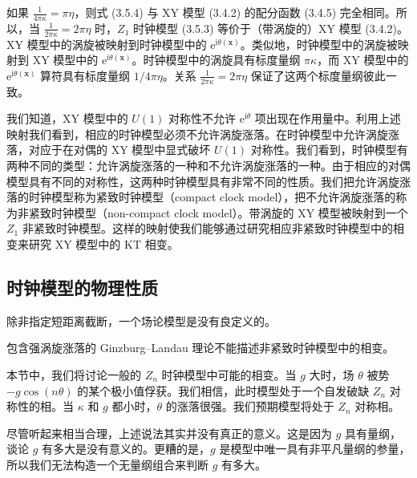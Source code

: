 如果 $\frac{1}{4\pi\kappa} = \pi\eta$，则式 (3.5.4) 与 XY 模型 (3.4.2) 的配分函数 (3.4.5) 完全相同。所以，当 $\frac{1}{2\pi\kappa} = 2\pi\eta$ 时，$Z_{1}$ 时钟模型 (3.5.3) 等价于（带涡旋的）XY 模型 (3.4.2)。XY 模型中的涡旋被映射到时钟模型中的 $\mathrm{e}^{\mathrm{i}\theta(\pmb{x})}$。类似地，时钟模型中的涡旋被映射到 XY 模型中的 $\mathrm{e}^{\mathrm{i}\theta(\pmb{x})}$。时钟模型中的涡旋具有标度量纲 $\pi\kappa$，而 XY 模型中的 $\mathrm{e}^{\mathrm{i}\theta(\pmb{x})}$ 算符具有标度量纲 $1/4\pi\eta$。关系 $\frac{1}{2\pi\kappa} = 2\pi\eta$ 保证了这两个标度量纲彼此一致。

我们知道，XY 模型中的 $U(1)$ 对称性不允许 $\mathrm{e}^{\mathrm{i}\theta}$ 项出现在作用量中。利用上述映射我们看到，相应的时钟模型必须不允许涡旋涨落。在时钟模型中允许涡旋涨落，对应于在对偶的 XY 模型中显式破坏 $U(1)$ 对称性。我们看到，时钟模型有两种不同的类型：允许涡旋涨落的一种和不允许涡旋涨落的一种。由于相应的对偶模型具有不同的对称性，这两种时钟模型具有非常不同的性质。我们把允许涡旋涨落的时钟模型称为紧致时钟模型（compact clock model），把不允许涡旋涨落的称为非紧致时钟模型（non-compact clock model）。带涡旋的 XY 模型被映射到一个 $Z_{1}$ 非紧致时钟模型。这样的映射使我们能够通过研究相应非紧致时钟模型中的相变来研究 XY 模型中的 KT 相变。

\subsection{时钟模型的物理性质}
\begin{keypoints}
\item 除非指定短距离截断，一个场论模型是没有良定义的。
\item 包含强涡旋涨落的 Ginzburg--Landau 理论不能描述非紧致时钟模型中的相变。
\end{keypoints}

本节中，我们将讨论一般的 $Z_{n}$ 时钟模型中可能的相变。当 $g$ 大时，场 $\theta$ 被势 $-g\cos(n\theta)$ 的某个极小值俘获。我们相信，此时模型处于一个自发破缺 $Z_{n}$ 对称性的相。当 $\kappa$ 和 $g$ 都小时，$\theta$ 的涨落很强。我们预期模型将处于 $Z_{n}$ 对称相。

尽管听起来相当合理，上述说法其实并没有真正的意义。这是因为 $g$ 具有量纲，谈论 $g$ 有多大是没有意义的。更糟的是，$g$ 是模型中唯一具有非平凡量纲的参量，所以我们无法构造一个无量纲组合来判断 $g$ 有多大。

